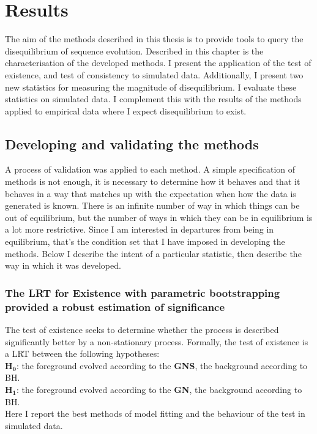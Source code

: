\chapter{Results}

The aim of the methods described in this thesis is to provide tools to query the disequilibrium of sequence evolution. Described in this chapter is the characterisation of the developed methods. I present the application of the test of existence, and test of consistency to simulated data. Additionally, I present two new statistics for measuring the magnitude of disequilibrium. I evaluate these statistics on simulated data. I complement this with the results of the methods applied to empirical data where I expect disequilibrium to exist.

\section*{Developing and validating the methods}

A process of validation was applied to each method. A simple specification of methods is not enough, it is necessary to determine how it behaves and that it behaves in a way that matches up with the expectation when how the data is generated is known. There is an infinite number of way in which things can be out of equilibrium, but the number of ways in which they can be in equilibrium is a lot more restrictive. Since I am interested in departures from being in equilibrium, that’s the condition set that I have imposed in developing the methods. Below I describe the intent of a particular statistic, then describe the way in which it was developed.

\subsection*{The LRT for Existence with parametric bootstrapping provided a robust estimation of significance}

The test of existence seeks to determine whether the process is described significantly better by a non-stationary process. Formally, the test of existence is a LRT between the following hypotheses:\\ $\mathbf{H_0}$: the foreground evolved according to the \textbf{GNS}, the background according to BH. \\ $\mathbf{H_1}$: the foreground evolved according to the \textbf{GN}, the background according to BH.\\
Here I report the best methods of model fitting and the behaviour of the test in simulated data. 


